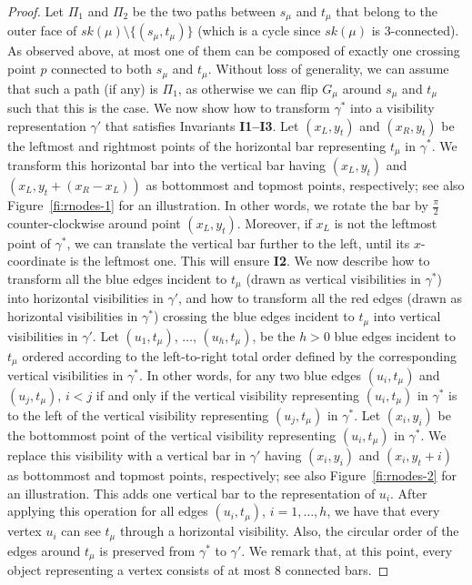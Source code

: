 \documentclass{article}
\newcommand{\ph}{\frac{\pi}{2}}
\begin{document}
\begin{proof}
Let $\Pi_1$ and $\Pi_2$ be the two paths between $s_\mu$ and $t_\mu$ that belong to the outer face of $sk(\mu) \setminus \{(s_\mu,t_\mu)\}$ (which is a cycle since $sk(\mu)$ is 3-connected). As observed above, at most one of them can be composed of exactly one crossing point $p$ connected to both $s_\mu$ and $t_\mu$.  Without loss of generality, we can assume that such a path (if any) is $\Pi_1$, as otherwise we can flip $G_\mu$ around $s_\mu$ and $t_\mu$ such that this is the case. We now show how to transform $\gamma^*$ into a visibility representation $\gamma'$ that satisfies Invariants {\bf I1--I3}. Let $(x_L,y_t)$ and $(x_R,y_t)$ be the leftmost and rightmost points of the horizontal bar representing $t_\mu$ in $\gamma^*$. We transform this horizontal bar into the vertical bar having $(x_L,y_t)$ and $(x_L,y_t+(x_R-x_L))$  as bottommost and topmost points, respectively; see also Figure~\ref{fi:rnodes-1} for an illustration. In other words, we rotate the bar by $\ph$ counter-clockwise around point $(x_L,y_t)$. Moreover, if $x_L$ is not the leftmost point of $\gamma^*$, we can translate the vertical bar further to the left, until its $x$-coordinate is the leftmost one. This will ensure {\bf I2}. We now describe how to transform all the blue edges incident to $t_\mu$ (drawn as vertical visibilities in $\gamma^*$) into horizontal visibilities in $\gamma'$, and how to transform all the red edges (drawn as horizontal visibilities in $\gamma^*$) crossing the blue edges incident to $t_\mu$ into vertical visibilities in $\gamma'$. Let $(u_1,t_\mu)$, $\dots$, $(u_h,t_\mu)$, be the $h > 0$ blue edges incident to $t_\mu$ ordered according to the left-to-right total order defined by the corresponding vertical visibilities in $\gamma^*$. In other words, for any two blue edges $(u_i,t_\mu)$ and $(u_j,t_\mu)$, $i < j$ if and only if the vertical visibility representing  $(u_i,t_\mu)$ in $\gamma^*$ is to the left of the vertical visibility representing $(u_j,t_\mu)$ in $\gamma^*$.  Let $(x_i,y_i)$ be the bottommost point of the vertical visibility representing $(u_i,t_\mu)$ in $\gamma^*$. We replace this visibility with a vertical bar in $\gamma'$ having $(x_i,y_i)$ and $(x_i,y_t+i)$ as bottommost and topmost points, respectively; see also Figure~\ref{fi:rnodes-2} for an illustration. This adds one vertical bar to the representation of $u_i$. After applying this operation for all edges  $(u_i,t_\mu)$, $i=1,\dots,h$, we have that every vertex $u_i$ can see $t_\mu$ through a horizontal visibility. Also, the circular order of the edges around $t_\mu$ is preserved from $\gamma^*$ to $\gamma'$. We remark that, at this point, every object representing a vertex consists of at most 8 connected bars.


\end{proof}
\end{document}
